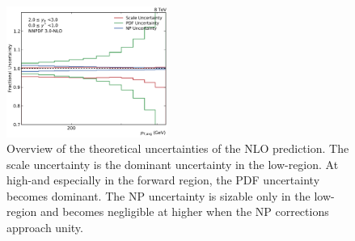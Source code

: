 \begin{figure}[htp]
    \includegraphics[width=0.47\textwidth]{figures/theory/theo_unc_yb2ys0.pdf}
    \caption[Overview of theoretical uncertaintites]{Overview of the theoretical uncertainties of the NLO prediction.
    The scale uncertainty is the dominant uncertainty in the low-\pt region. At
    high-\pt and especially in the forward region, the PDF uncertainty becomes
    dominant. The NP uncertainty is sizable only in the low-\pt region and becomes
    negligible at higher \pt when the NP corrections approach unity.}
    \label{fig:theo_uncertainties}
\end{figure}
